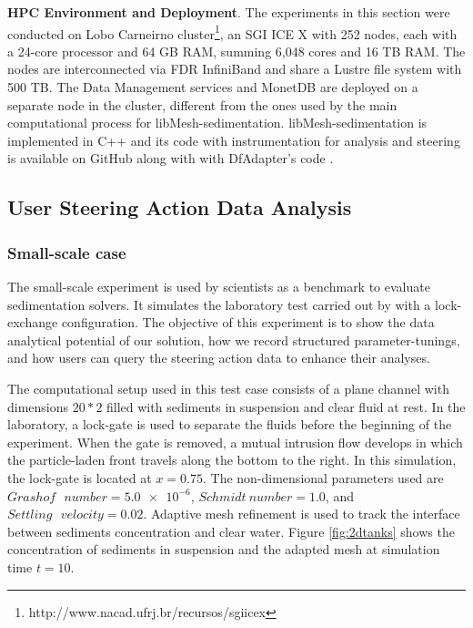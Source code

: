 \textbf{HPC Environment and Deployment}. The experiments in this section were conducted on Lobo Carneirno cluster\footnote{http://www.nacad.ufrj.br/recursos/sgiicex}, an SGI ICE X with 252 nodes, each with a 24-core processor and 64 GB RAM, summing 6,048 cores and 16 TB RAM. The nodes are interconnected via FDR InfiniBand and share a Lustre file system with 500 TB. The Data Management services and MonetDB are deployed on a separate node in the cluster, different from the ones used by the main computational process for libMesh-sedimentation.
libMesh-sedimentation is implemented in C++ and its code with instrumentation for analysis and steering is available on GitHub \cite{libMeshSed_github} along with with DfAdapter's code \cite{DfAdapterGitHubDfAdapter}.










\subsection{User Steering Action Data Analysis}
\label{sec_steering_action_analysis_workflow_script}

\subsubsection{Small-scale case}
\label{sub_dfadapter_experiments}


The small-scale experiment is used by scientists as a benchmark to
evaluate sedimentation solvers. It simulates the laboratory test carried
out by \citet{DeRooij2001Time-} with a
lock-exchange configuration. The objective of this experiment is to show
the data analytical potential of our solution, how we record structured
parameter-tunings, and how users can query the steering action data to
enhance their analyses.

The computational setup used in this test case consists of a plane
channel with dimensions $20 * 2$ filled with sediments in suspension and
clear fluid at rest. In the laboratory, a lock-gate is used to separate
the fluids before the beginning of the experiment. When the gate is
removed, a mutual intrusion flow develops in which the particle-laden
front travels along the bottom to the right. In this simulation, the
lock-gate is located at $x = 0.75$. The non-dimensional parameters used
are $Grashof \text{ } number = \num{5.0e-6}$, $Schmidt \ number = 1.0$,
and $Settling \text{ } velocity = 0.02$. Adaptive mesh refinement is used to track
the interface between sediments concentration and clear water. Figure \ref{fig:2dtanks}
shows the concentration of sediments in suspension and the adapted mesh
at simulation time $t = 10$.

